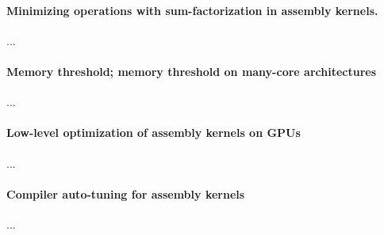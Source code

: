 \paragraph{Minimizing operations with sum-factorization in assembly kernels.}
...

\paragraph{Memory threshold; memory threshold on many-core architectures}
...

\paragraph{Low-level optimization of assembly kernels on GPUs}
...

\paragraph{Compiler auto-tuning for assembly kernels}
...

%
